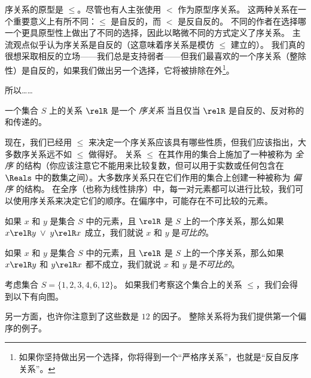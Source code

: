 序关系的原型是 $\leq$。尽管也有人主张使用 $<$ 作为原型序关系。
这两种关系在一个重要意义上有所不同：$\leq$ 是自反的，而 $<$ 是反自反的。
不同的作者在选择哪一个更具原型性上做出了不同的选择，因此以略微不同的方式定义了序关系。
主流观点似乎认为序关系是自反的（这意味着序关系是模仿 $\leq$ 建立的）。
我们真的很想采取相反的立场——我们总是支持弱者——但我们最喜欢的一个序关系（整除性）是自反的，如果我们做出另一个选择，它将被排除在外\footnote{如果你坚持做出另一个选择，你将得到一个“严格序关系”，也就是“反自反序关系”。}。

所以……

\begin{defi}
一个集合 $S$ 上的关系 $\relR$ 是一个
\emph{序关系}
当且仅当 $\relR$ 是自反的、反对称的和传递的。
\end{defi}

现在，我们已经用 $\leq$ 来决定一个序关系应该具有哪些性质，但我们应该指出，大多数序关系远不如 $\leq$ 做得好。
关系 $\leq$ 在其作用的集合上施加了一种被称为 \emph{全序} 的结构（你应该注意它不能用来比较复数，但可以用于实数或任何包含在 $\Reals$ 中的数集之间）。大多数序关系只在它们作用的集合上创建一种被称为 \emph{偏序} 的结构。
在全序（也称为线性排序）中，每一对元素都可以进行比较，我们可以使用序关系来决定它们的顺序。在偏序中，可能存在不可比较的元素。

\begin{defi}
如果 $x$ 和 $y$ 是集合 $S$ 中的元素，且 $\relR$ 是 $S$ 上的一个序关系，那么如果 $x\relR y \; \lor \; y\relR x$ 成立，我们就说 $x$ 和 $y$ 是\emph{可比的}。
\end{defi}

\begin{defi}
如果 $x$ 和 $y$ 是集合 $S$ 中的元素，且 $\relR$ 是 $S$ 上的一个序关系，那么如果 $x\relR y$ 和 $y\relR x$ 都不成立，我们就说 $x$ 和 $y$ 是\emph{不可比的}。
\end{defi}

考虑集合 $S = \{1, 2, 3, 4, 6, 12 \}$。
如果我们考察这个集合上的关系 $\leq$，我们会得到以下有向图。

\begin{center}

\end{center}

另一方面，也许你注意到了这些数是 $12$ 的因子。
整除关系将为我们提供第一个偏序的例子。

\begin{center}

\end{center}

